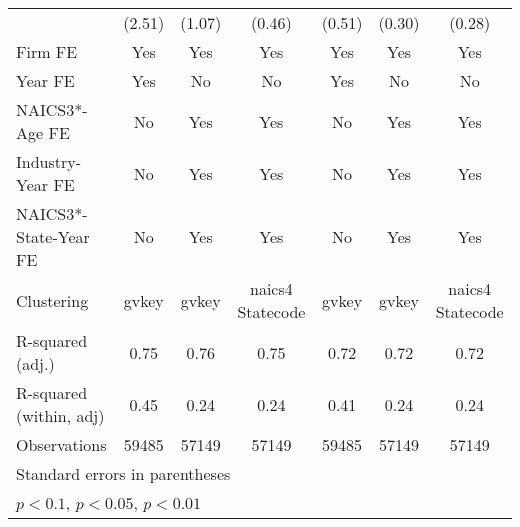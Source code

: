 {\begin{tabular}{l*{6}{c}}
                    &      (2.51)         &      (1.07)         &      (0.46)         &      (0.51)         &      (0.30)         &      (0.28)         \\
\addlinespace
Firm FE             &         Yes         &         Yes         &         Yes         &         Yes         &         Yes         &         Yes         \\
\addlinespace
Year FE             &         Yes         &          No         &          No         &         Yes         &          No         &          No         \\
\addlinespace
NAICS3*-Age FE      &          No         &         Yes         &         Yes         &          No         &         Yes         &         Yes         \\
\addlinespace
Industry-Year FE    &          No         &         Yes         &         Yes         &          No         &         Yes         &         Yes         \\
\addlinespace
NAICS3*-State-Year FE&          No         &         Yes         &         Yes         &          No         &         Yes         &         Yes         \\
\midrule
Clustering          &       gvkey         &       gvkey         &naics4 Statecode         &       gvkey         &       gvkey         &naics4 Statecode         \\
R-squared (adj.)    &        0.75         &        0.76         &        0.75         &        0.72         &        0.72         &        0.72         \\
R-squared (within, adj)&        0.45         &        0.24         &        0.24         &        0.41         &        0.24         &        0.24         \\
Observations        &       59485         &       57149         &       57149         &       59485         &       57149         &       57149         \\
\bottomrule
\multicolumn{7}{l}{\footnotesize Standard errors in parentheses}\\
\multicolumn{7}{l}{\footnotesize \sym{*} \(p<0.1\), \sym{**} \(p<0.05\), \sym{***} \(p<0.01\)}\\
\end{tabular}
}
